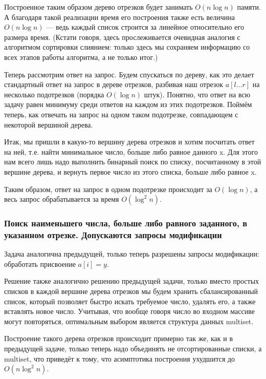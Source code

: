 Построенное таким образом дерево отрезков будет занимать $O (n \log n)$ памяти. А благодаря такой реализации время его построения также есть величина $O (n \log n)$ — ведь каждый список строится за линейное относительно его размера время. (Кстати говоря, здесь прослеживается очевидная аналогия с алгоритмом сортировки слиянием: только здесь мы сохраняем информацию со всех этапов работы алгоритма, а не только итог.)

Теперь рассмотрим ответ на запрос. Будем спускаться по дереву, как это делает стандартный ответ на запрос в дереве отрезков, разбивая наш отрезок $a[l \ldots r]$ на несколько подотрезков (порядка $O (\log n)$ штук). Понятно, что ответ на всю задачу равен минимуму среди ответов на каждом из этих подотрезков. Поймём теперь, как отвечать на запрос на одном таком подотрезке, совпадающем с некоторой вершиной дерева.

Итак, мы пришли в какую-то вершину дерева отрезков и хотим посчитать ответ на ней, т.е. найти минимальное число, больше либо равное данного x. Для этого нам всего лишь надо выполнить бинарный поиск по списку, посчитанному в этой вершине дерева, и вернуть первое число из этого списка, больше либо равное x.

Таким образом, ответ на запрос в одном подотрезке происходит за $O (\log n)$, а весь запрос обрабатывается за время $O (\log^2 n)$.

\subsubsection{Поиск наименьшего числа, больше либо равного заданного, в указанном отрезке. Допускаются запросы модификации}

Задача аналогична предыдущей, только теперь разрешены запросы модификации: обработать присвоение $a[i] = y$.

Решение также аналогично решению предыдущей задачи, только вместо простых списков в каждой вершине дерева отрезков мы будем хранить сбалансированный список, который позволяет быстро искать требуемое число, удалять его, а также вставлять новое число. Учитывая, что вообще говоря число во входном массиве могут повторяться, оптимальным выбором является структура данных \rm multiset.

Построение такого дерева отрезков происходит примерно так же, как и в предыдущей задаче, только теперь надо объединять не отсортированные списки, а \rm multiset, что приведёт к тому, что асимптотика построения ухудшится до $O (n \log^2 n)$.


